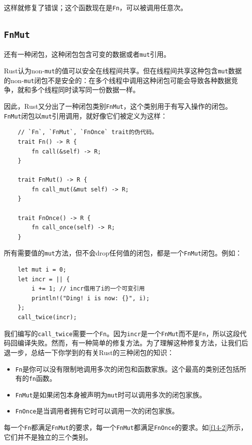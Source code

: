 这样就修复了错误；这个函数现在是\texttt{Fn}，可以被调用任意次。

\subsection{\texttt{FnMut}}
还有一种闭包，这种闭包包含可变的数据或者\texttt{mut}引用。

Rust认为non-\texttt{mut}的值可以安全在线程间共享。但在线程间共享这种包含\texttt{mut}数据的non-\texttt{mut}闭包不是安全的：在多个线程中调用这种闭包可能会导致各种数据竞争，就和多个线程同时读写同一份数据一样。

因此，Rust又分出了一种闭包类别\texttt{FnMut}，这个类别用于有写入操作的闭包。\texttt{FnMut}闭包以\texttt{mut}引用调用，就好像它们被定义为这样：
\begin{verbatim}
    // `Fn`, `FnMut`, `FnOnce` trait的伪代码。
    trait Fn() -> R {
        fn call(&self) -> R;
    }

    trait FnMut() -> R {
        fn call_mut(&mut self) -> R;
    }

    trait FnOnce() -> R {
        fn call_once(self) -> R;
    }
\end{verbatim}

所有需要值的\texttt{mut}方法，但不会drop任何值的闭包，都是一个\texttt{FnMut}闭包。例如：
\begin{verbatim}
    let mut i = 0;
    let incr = || {
        i += 1; // incr借用了i的一个可变引用
        println!("Ding! i is now: {}", i);
    };
    call_twice(incr);
\end{verbatim}

我们编写的\texttt{call\_twice}需要一个\texttt{Fn}。因为\texttt{incr}是一个\texttt{FnMut}而不是\texttt{Fn}，所以这段代码回编译失败。然而，有一种简单的修复方法。为了理解这种修复方法，让我们后退一步，总结一下你学到的有关Rust的三种闭包的知识：
\begin{itemize}
    \item \texttt{Fn}是你可以没有限制地调用多次的闭包和函数家族。这个最高的类别还包括所有的\texttt{fn}函数。
    \item \texttt{FnMut}是如果闭包本身被声明为\texttt{mut}时可以调用多次的闭包家族。
    \item \texttt{FnOnce}是当调用者拥有它时可以调用一次的闭包家族。
\end{itemize}

每一个\texttt{Fn}都满足\texttt{FnMut}的要求，每一个\texttt{FnMut}都满足\texttt{FnOnce}的要求。如\autoref{f14-2}所示，它们并不是独立的三个类别。

